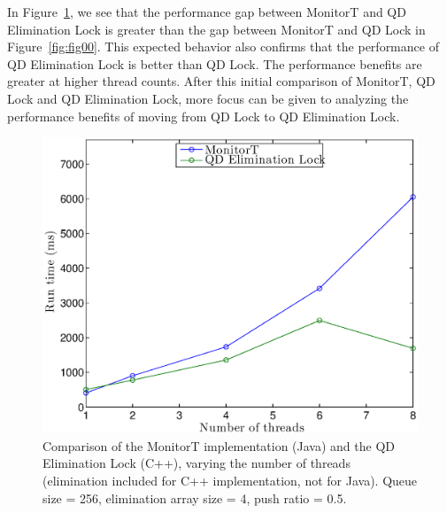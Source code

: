 
In Figure~\ref{fig:fig02}, we see that the performance gap between MonitorT and QD Elimination Lock is greater than the gap between MonitorT and QD Lock in Figure~\ref{fig:fig00}. This expected behavior also confirms that the performance of QD Elimination Lock is better than QD Lock. The performance benefits are greater at higher thread counts. After this initial comparison of MonitorT, QD Lock and QD Elimination Lock, more focus can be given to analyzing the performance benefits of moving from QD Lock to QD Elimination Lock.

\begin{figure}[!h]
\centering
\includegraphics[width=.75\textwidth]{figs/02_TimeVsThreads_cppElim_javaNoElim.eps}
\caption[]{Comparison of the MonitorT implementation (Java) and the QD Elimination Lock (C++), varying the number of threads (elimination included for C++ implementation, not for Java). Queue size = 256, elimination array size = 4, push ratio = 0.5.}
\label{fig:fig02}
\end{figure}


